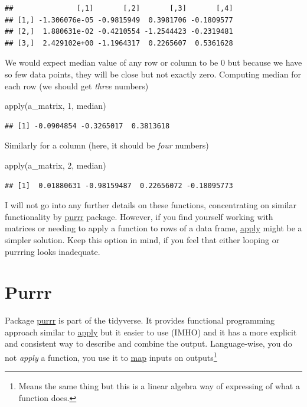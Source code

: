 \documentclass[
]{book}
\newenvironment{Shaded}{\begin{snugshade}}{\end{snugshade}}
\newcommand{\DecValTok}[1]{\textcolor[rgb]{0.00,0.00,0.81}{#1}}
\newcommand{\FunctionTok}[1]{\textcolor[rgb]{0.00,0.00,0.00}{#1}}
\newcommand{\NormalTok}[1]{#1}
\begin{document}
\begin{verbatim}
##               [,1]       [,2]       [,3]       [,4]
## [1,] -1.306076e-05 -0.9815949  0.3981706 -0.1809577
## [2,]  1.880631e-02 -0.4210554 -1.2544423 -0.2319481
## [3,]  2.429102e+00 -1.1964317  0.2265607  0.5361628
\end{verbatim}

We would expect median value of any row or column to be 0 but because we have so few data points, they will be close but not exactly zero. Computing median for each row (we should get \emph{three} numbers)

\begin{Shaded}
\begin{Highlighting}[]
\FunctionTok{apply}\NormalTok{(a\_matrix, }\DecValTok{1}\NormalTok{, median)}
\end{Highlighting}
\end{Shaded}

\begin{verbatim}
## [1] -0.0904854 -0.3265017  0.3813618
\end{verbatim}

Similarly for a column (here, it should be \emph{four} numbers)

\begin{Shaded}
\begin{Highlighting}[]
\FunctionTok{apply}\NormalTok{(a\_matrix, }\DecValTok{2}\NormalTok{, median)}
\end{Highlighting}
\end{Shaded}

\begin{verbatim}
## [1]  0.01880631 -0.98159487  0.22656072 -0.18095773
\end{verbatim}

I will not go into any further details on these functions, concentrating on similar functionality by \protect\hyperlink{purrr}{purrr} package. However, if you find yourself working with matrices or needing to apply a function to rows of a data frame, \href{https://stat.ethz.ch/R-manual/R-devel/library/base/html/apply.html}{apply} might be a simpler solution. Keep this option in mind, if you feel that either looping or purrring looks inadequate.

\hypertarget{purrr}{%
\section{Purrr}\label{purrr}}

Package \href{https://purrr.tidyverse.org/}{purrr} is part of the tidyverse. It provides functional programming approach similar to \href{https://stat.ethz.ch/R-manual/R-devel/library/base/html/apply.html}{apply} but it easier to use (IMHO) and it has a more explicit and consistent way to describe and combine the output. Language-wise, you do not \emph{apply} a function, you use it to \href{https://purrr.tidyverse.org/reference/map.html}{map} inputs on outputs\footnote{Means the same thing but this is a linear algebra way of expressing of what a function does.}
\end{document}
